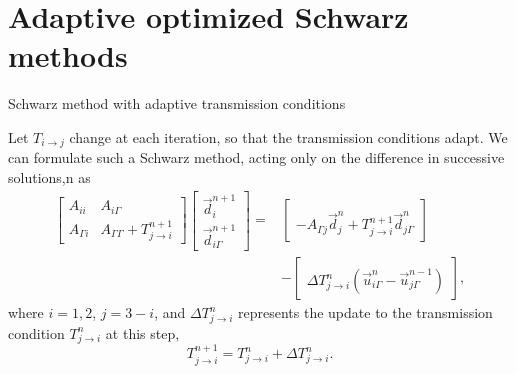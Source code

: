\documentclass{beamer}
\begin{document}





\section{Adaptive optimized Schwarz methods} %

\begin{frame}{Schwarz method with adaptive transmission conditions}

Let $T_{i \to j}$ change at each iteration, so that the transmission conditions adapt.
We can formulate such a Schwarz method, acting only on the difference in successive solutions,n as
\begin{align*}
	\begin{bmatrix} A_{ii} & A_{i \Gamma} \\ A_{\Gamma i} & A_{\Gamma \Gamma} + T_{j \to i}^{n+1} \end{bmatrix}
	\begin{bmatrix} \vec{d}_i^{n+1} \\ \vec{d}_{i \Gamma}^{n+1} \end{bmatrix}
	= & \begin{bmatrix} ~ \\ -A_{\Gamma j} \vec{d}_j^n + T_{j \to i}^{n+1} \vec{d}_{j \Gamma}^n \end{bmatrix} \\
	& - \begin{bmatrix} ~ \\ \Delta T_{j \to i}^n \left ( \vec{u}_{i \Gamma}^n - \vec{u}_{j \Gamma}^{n-1} \right ) \end{bmatrix},
\end{align*}
where $i=1,2$, $j=3-i$, and $\Delta T_{j \to i}^n$ represents the update to the transmission condition $T_{j \to i}^n$ at this step,
\begin{equation*}
	T_{j \to i}^{n+1} = T_{j \to i}^n + \Delta T_{j \to i}^n.
\end{equation*}
\end{frame}
\end{document}
